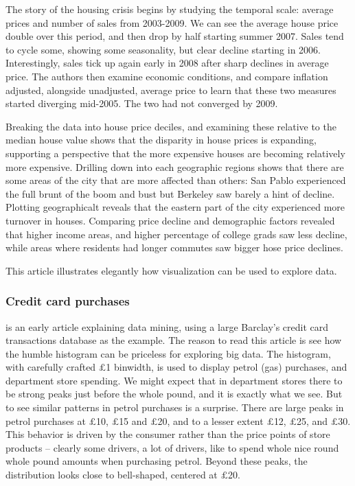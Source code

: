 \documentclass{article}
\begin{document}
The story of the housing crisis begins by studying the temporal scale: average prices and number of sales from 2003-2009. We can see the average house price double over this period, and then drop by half starting summer 2007. Sales tend to cycle some, showing some seasonality, but clear decline starting in 2006. Interestingly, sales tick up again early in 2008 after sharp declines in average price. The authors then examine economic conditions, and compare inflation adjusted,  alongside unadjusted, average price to learn that these two measures started diverging mid-2005. The two had not converged by 2009.

Breaking the data into house price deciles, and examining these relative to the median house value shows that the disparity in house prices is expanding, supporting a perspective that the more expensive houses are becoming relatively more expensive. Drilling down into each geographic regions shows that there are some areas of the city that are more affected than others: San Pablo experienced the full brunt of the boom and bust but Berkeley saw barely a hint of decline. Plotting geographicalt reveals that the eastern part of the city experienced more turnover in houses. Comparing price decline and demographic factors revealed that higher income areas, and higher percentage of college grads saw less decline, while areas where residents had longer commutes saw bigger hose price declines. 

This article illustrates elegantly how visualization can be used to explore data. 

\subsubsection{Credit card purchases}

\citet{hand2000} is an early article explaining data mining, using a large Barclay's credit card transactions database as the example. The reason to read this article is see how the humble histogram can be priceless for exploring big data. The histogram, with carefully crafted $\pounds$1 binwidth, is used to display petrol (gas) purchases, and department store spending. We might expect that in department stores there to be strong peaks just before the whole pound, and it is exactly what we see. But to see similar patterns in petrol purchases is a surprise. There are large peaks in petrol purchases at $\pounds$10, $\pounds$15 and $\pounds$20, and to a lesser extent $\pounds$12, $\pounds$25, and $\pounds$30. This behavior is driven by the consumer rather than the price points of store products -- clearly some drivers, a lot of drivers, like to spend whole nice round whole pound amounts when purchasing petrol. Beyond these peaks, the distribution looks close to bell-shaped, centered at $\pounds$20. 
\end{document}

